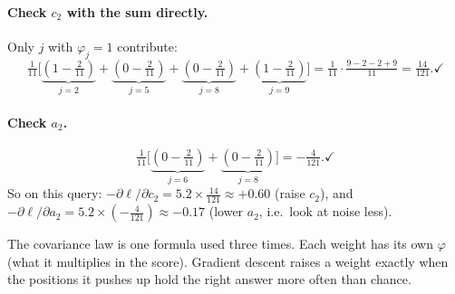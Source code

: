 \documentclass[11pt]{article}
\newcommand{\1}{\mathbf{1}}
\begin{document}
\paragraph{Check $c_2$ with the sum directly.} Only $j$ with $\varphi_j=1$ contribute:
\[
\tfrac1{11}\Big[\underbrace{(1-\tfrac2{11})}_{j=2}+\underbrace{(0-\tfrac2{11})}_{j=5}+\underbrace{(0-\tfrac2{11})}_{j=8}+\underbrace{(1-\tfrac2{11})}_{j=9}\Big]
=\tfrac1{11}\cdot\tfrac{9-2-2+9}{11}=\tfrac{14}{121}. \checkmark
\]
\paragraph{Check $a_2$.}
\[
\tfrac1{11}\Big[\underbrace{(0-\tfrac2{11})}_{j=6}+\underbrace{(0-\tfrac2{11})}_{j=8}\Big]=-\tfrac{4}{121}. \checkmark
\]
So on this query: $-\partial\ell/\partial c_2 = 5.2\times\tfrac{14}{121}\approx +0.60$ (raise $c_2$), and
$-\partial\ell/\partial a_2 = 5.2\times(-\tfrac{4}{121})\approx -0.17$ (lower $a_2$, i.e.\ look at noise less).

\begin{idea}
The covariance law is one formula used three times. Each weight has its own $\varphi$ (what it multiplies in
the score). Gradient descent raises a weight exactly when the positions it pushes up hold the right answer
more often than chance.
\end{idea}
\end{document}
